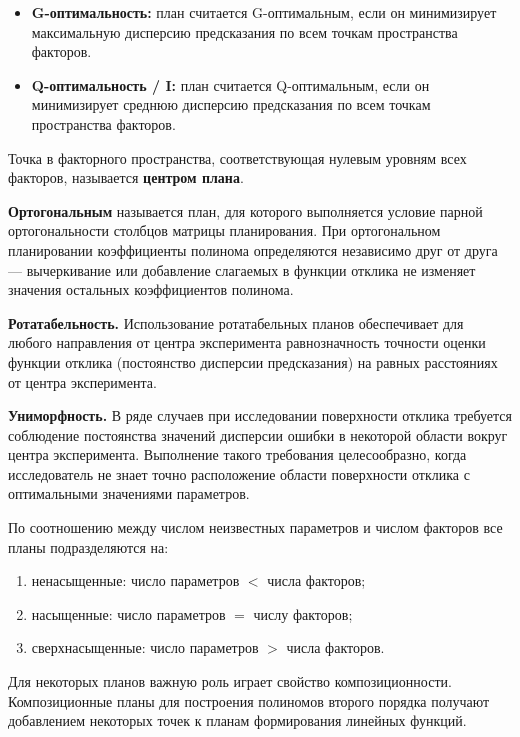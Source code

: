 \begin{itemize}
  \item \textbf{G-оптимальность:} план считается G-оптимальным, если он минимизирует максимальную дисперсию предсказания по всем точкам пространства факторов.
  \item \textbf{Q-оптимальность / I:} план считается Q-оптимальным, если он минимизирует среднюю дисперсию предсказания по всем точкам пространства факторов.
\end{itemize}

Точка в факторного пространства, соответствующая нулевым уровням всех факторов, называется \textbf{центром плана}.

\textbf{Ортогональным} называется план, для которого выполняется условие парной ортогональности столбцов матрицы планирования. При ортогональном планировании коэффициенты полинома определяются независимо друг от друга — вычеркивание или добавление слагаемых в функции отклика не изменяет значения остальных коэффициентов полинома.

\textbf{Ротатабельность.} Использование ротатабельных планов обеспечивает для любого направления от центра эксперимента равнозначность точности оценки функции отклика (постоянство дисперсии предсказания) на равных расстояниях от центра эксперимента.

\textbf{Униморфность.} В ряде случаев при исследовании поверхности отклика требуется соблюдение постоянства значений дисперсии ошибки в некоторой области вокруг центра эксперимента. Выполнение такого требования целесообразно, когда исследователь не знает точно расположение области поверхности отклика с оптимальными значениями параметров.

По соотношению между числом неизвестных параметров и числом факторов все планы подразделяются на:
\begin{enumerate}
  \item ненасыщенные: число параметров $<$ числа факторов;
  \item насыщенные: число параметров $=$ числу факторов;
  \item сверхнасыщенные: число параметров $>$ числа факторов.
\end{enumerate}

Для некоторых планов важную роль играет свойство композиционности. Композиционные планы для построения полиномов второго порядка получают добавлением некоторых точек к планам формирования линейных функций.

\clearpage
